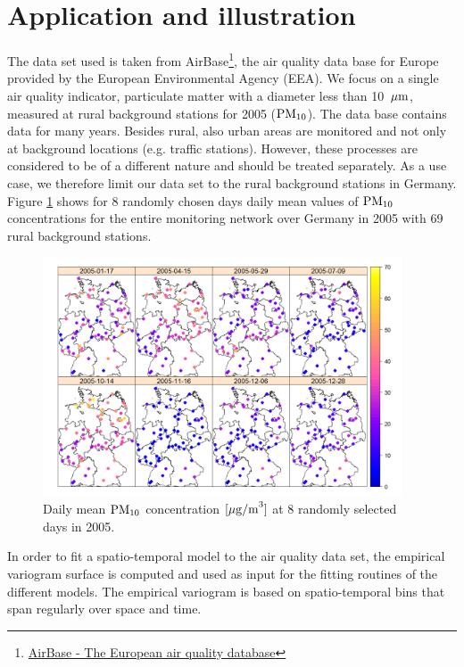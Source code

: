 \section{Application and illustration}\label{sec:data}

The data set used is taken from AirBase\footnote{\href{http://www.eea.europa.eu/data-and-maps/data/airbase-the-european-air-quality-database-6}{AirBase - The European air quality database}}, the air quality data base for Europe provided by the European Environmental Agency (EEA). We focus on a single air quality indicator, particulate matter with a diameter less than 10~$\mu\rm m$, measured at rural background stations for 2005 (${\rm PM}_{10}$). The data base contains data for many years. Besides rural, also urban areas are monitored and not only at background locations (e.g. traffic stations). However, these processes are considered to be of a different nature and should be treated separately. As a use case, we therefore limit our data set to the rural background stations in Germany. Figure \ref{fig:dailyMeans} shows for 8 randomly chosen days daily mean values of ${\rm PM}_{10}$ concentrations for the entire monitoring network over Germany in 2005 with 69 rural background stations.

\begin{figure}
\centering
\includegraphics[width=0.95\textwidth]{daily_means_PM10.png}
\caption{Daily mean $\rm{PM}_{10}$ concentration $[\mu\rm{g/m}^3]$ at 8 randomly selected days in 2005.}\label{fig:dailyMeans}
\end{figure}

In order to fit a spatio-temporal model to the air quality data set, the empirical variogram surface is computed and used as input for the fitting routines of the different models. The empirical variogram is based on spatio-temporal bins that span regularly over space and time. 


